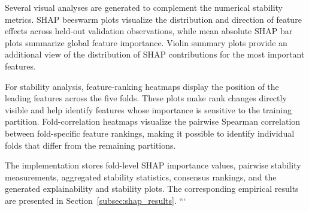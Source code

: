 Several visual analyses are generated to complement the numerical stability
metrics. SHAP beeswarm plots visualize the distribution and direction of feature
effects across held-out validation observations, while mean absolute SHAP bar
plots summarize global feature importance. Violin summary plots provide an
additional view of the distribution of SHAP contributions for the most
important features.

For stability analysis, feature-ranking heatmaps display the position of the
leading features across the five folds. These plots make rank changes directly
visible and help identify features whose importance is sensitive to the
training partition. Fold-correlation heatmaps visualize the pairwise Spearman
correlation between fold-specific feature rankings, making it possible to
identify individual folds that differ from the remaining partitions.

The implementation stores fold-level SHAP importance values, pairwise stability
measurements, aggregated stability statistics, consensus rankings, and the
generated explainability and stability plots. The corresponding empirical
results are presented in Section~\ref{subsec:shap_results}.
```

